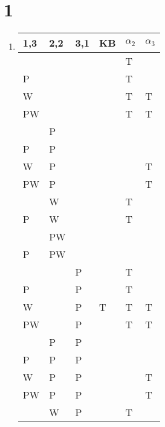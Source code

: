 
%

\section*{1}
\begin{enumerate}
    \item
        \begin{table}[h]
            \centering
            \begin{tabular}{l|l|l|l|l|l}
                \hline
                1,3 & 2,2 & 3,1 & KB & $\alpha_2$ & $\alpha_3$ \\\hline
                ~  & ~  & ~  & ~ & T & ~ \\
                P  & ~  & ~  & ~ & T & ~ \\
                W  & ~  & ~  & ~ & T & T \\
                PW & ~  & ~  & ~ & T & T \\
                ~  & P  & ~  & ~ & ~ & ~ \\
                P  & P  & ~  & ~ & ~ & ~ \\
                W  & P  & ~  & ~ & ~ & T \\
                PW & P  & ~  & ~ & ~ & T \\
                ~  & W  & ~  & ~ & T & ~ \\
                P  & W  & ~  & ~ & T & ~ \\
                ~  & PW & ~  & ~ & ~ & ~ \\
                P  & PW & ~  & ~ & ~ & ~ \\
                ~  & ~  & P  & ~ & T & ~ \\
                P  & ~  & P  & ~ & T & ~ \\
                W  & ~  & P  & T & T & T \\
                PW & ~  & P  & ~ & T & T \\
                ~  & P  & P  & ~ & ~ & ~ \\
                P  & P  & P  & ~ & ~ & ~ \\
                W  & P  & P  & ~ & ~ & T \\
                PW & P  & P  & ~ & ~ & T \\
                ~  & W  & P  & ~ & T & ~ \\

\end{tabular}
\end{table}
\end{enumerate}

